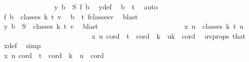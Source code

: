 \begin{isabellebody}
\ {\isacharminus}{\kern0pt}\isanewline
\ \ \ \ \ \ \ \ \ \ \ \ \isamarkupfalse%
\ {\isachardoublequoteopen}y\ b\ {\isacharequal}{\kern0pt}\ S\ {\isacharparenleft}{\kern0pt}{\isacharquery}{\kern0pt}f\ b{\isacharparenright}{\kern0pt}{\isachardoublequoteclose}\ \isamarkupfalse%
\ y{\isacharunderscore}{\kern0pt}def\ \isamarkupfalse%
\ {\isacartoucheopen}b\ {\isacharequal}{\kern0pt}\ t{\isacartoucheclose}\ \isamarkupfalse%
\ auto\isanewline
\ \ \ \ \ \ \ \ \ \ \ \ \isamarkupfalse%
\ \isamarkupfalse%
\ {\isachardoublequoteopen}{\isacharquery}{\kern0pt}f\ b\ {\isasymin}\ classes\ k\ t\ v{\isachardoublequoteclose}\ \isamarkupfalse%
\ {\isacartoucheopen}b\ {\isacharequal}{\kern0pt}\ t{\isacartoucheclose}\ f{\isacharunderscore}{\kern0pt}classes{\isacharunderscore}{\kern0pt}v\ \isamarkupfalse%
\ blast\isanewline
\ \ \ \ \ \ \ \ \ \ \ \ \isamarkupfalse%
\ \isamarkupfalse%
\ {\isachardoublequoteopen}y\ b\ {\isasymin}\ S\ {\isacharbackquote}{\kern0pt}\ classes\ k\ t\ v{\isachardoublequoteclose}\ \isamarkupfalse%
\ blast\isanewline
\ \ \ \ \ \ \ \ \ \ \isamarkupfalse%
\isanewline
\ \ \ \ \ \ \ \ \ \ \isamarkupfalse%
\ \isamarkupfalse%
\ {\isachardoublequoteopen}x\ u\ {\isasymin}\ classes\ k\ t\ u{\isachardoublequoteclose}\isanewline
\ \ \ \ \ \ \ \ \ \ \isamarkupfalse%
\ {\isacharminus}{\kern0pt}\isanewline
\ \ \ \ \ \ \ \ \ \ \ \ \isamarkupfalse%
\ {\isachardoublequoteopen}x\ u\ cord\ {\isacharequal}{\kern0pt}\ t{\isachardoublequoteclose}\ \ {\isachardoublequoteopen}cord\ {\isasymin}\ {\isacharbraceleft}{\kern0pt}k\ {\isacharminus}{\kern0pt}\ u{\isachardot}{\kern0pt}{\isachardot}{\kern0pt}{\isacharless}{\kern0pt}k{\isacharbraceright}{\kern0pt}{\isachardoublequoteclose}\ \ cord\ \isamarkupfalse%
\ uv{\isacharunderscore}{\kern0pt}props\ that\ \isamarkupfalse%
\ x{\isacharunderscore}{\kern0pt}def\ \isamarkupfalse%
\ simp\ \isanewline
\ \ \ \ \ \ \ \ \ \ \ \ \isamarkupfalse%
\ \isanewline
\ \ \ \ \ \ \ \ \ \ \ \ \isacommand{{\isacharbraceleft}{\kern0pt}}\isamarkupfalse%
\ \ \isanewline
\ \ \ \ \ \ \ \ \ \ \ \ \ \ \isamarkupfalse%
\ {\isachardoublequoteopen}x\ u\ cord\ {\isasymnoteq}\ t{\isachardoublequoteclose}\ \ {\isachardoublequoteopen}cord\ {\isasymin}\ {\isacharbraceleft}{\kern0pt}{\isachardot}{\kern0pt}{\isachardot}{\kern0pt}{\isacharless}{\kern0pt}k\ {\isacharminus}{\kern0pt}\ u{\isacharbraceright}{\kern0pt}{\isachardoublequoteclose}\ \ cord\ \isamarkupfalse%

\end{isabellebody}
